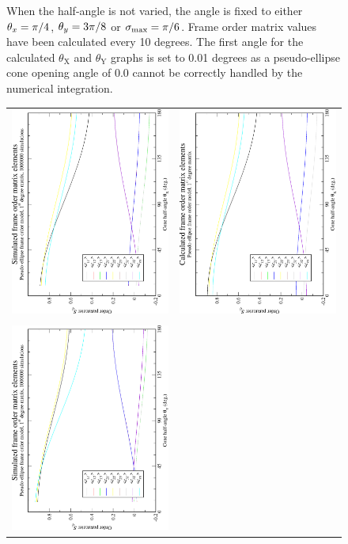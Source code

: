 \begin{figure}
{    When the half-angle is not varied, the angle is fixed to either $\theta_x = \pi/4$, $\theta_y = 3\pi/8$ or $\sigma_\textrm{max} = \pi/6$.
    Frame order matrix values have been calculated every 10 degrees.
    The first angle for the calculated $\theta_\textrm{X}$ and $\theta_\textrm{Y}$ graphs is set to 0.01 degrees as a pseudo-ellipse cone opening angle of 0.0 cannot be correctly handled by the numerical integration.
  }
  \label{fig: simulated and calculated in-frame 2nd degree pseudo-ellipse frame order}
\end{figure}

\begin{figure}
\centering
  \begin{tabular}{@{}cc@{}}
    \includegraphics[width=.35\textwidth,angle=270]{images/frame_order_matrix/Sij_pseudo-ellipse_out_of_frame_theta_x_ens1000000.eps} &
    \includegraphics[width=.35\textwidth,angle=270]{images/frame_order_matrix/Sij_pseudo-ellipse_out_of_frame_theta_x_calc.eps} \\
    \\[-5pt]
    \includegraphics[width=.35\textwidth,angle=270]{images/frame_order_matrix/Sij_pseudo-ellipse_out_of_frame_theta_y_ens1000000.eps} &

\end{tabular}
\end{figure}
